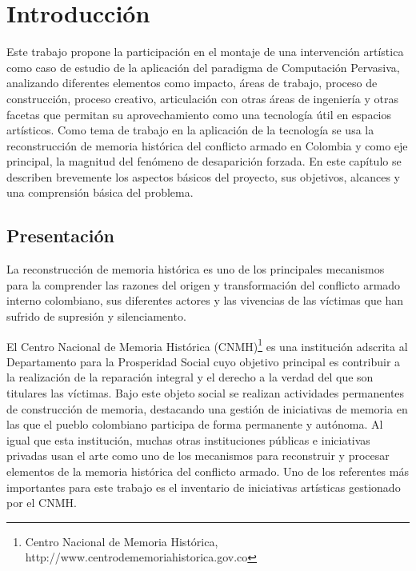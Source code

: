 
\chapter{Introducción}

Este trabajo propone la participación en el montaje de una intervención artística como caso de estudio de la aplicación del paradigma de Computación Pervasiva\cite{RN1}, analizando diferentes elementos como impacto, áreas de trabajo, proceso de construcción, proceso creativo, articulación con otras áreas de ingeniería y otras facetas que permitan su aprovechamiento como una tecnología útil en espacios artísticos. Como tema de trabajo en la aplicación de la tecnología se usa la reconstrucción de memoria histórica del conflicto armado en Colombia y como eje principal, la magnitud del fenómeno de desaparición forzada. En este capítulo se describen brevemente los aspectos básicos del proyecto, sus objetivos, alcances y una comprensión básica del problema.

\section{Presentación}

La reconstrucción de memoria histórica es uno de los principales mecanismos para la comprender las razones del origen y transformación del conflicto armado interno colombiano, sus diferentes actores y las vivencias de las víctimas que han sufrido de supresión y silenciamento.

El Centro Nacional de Memoria Histórica (CNMH)\footnote{Centro Nacional de Memoria Histórica, http://www.centrodememoriahistorica.gov.co} es una institución adscrita al Departamento para la Prosperidad Social cuyo objetivo principal es contribuir a la realización de la reparación integral y el derecho a la verdad del que son titulares las víctimas. Bajo este objeto social se realizan actividades permanentes de construcción de memoria, destacando una gestión de iniciativas de memoria en las que el pueblo colombiano participa de forma permanente y autónoma. Al igual que esta institución, muchas otras instituciones públicas e iniciativas privadas usan el arte como uno de los mecanismos para reconstruir y procesar elementos de la memoria histórica del conflicto armado. Uno de los referentes más importantes para este trabajo es el inventario de iniciativas artísticas gestionado por el CNMH.

